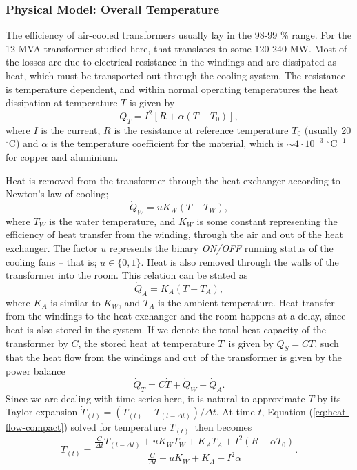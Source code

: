 \documentclass[]{article}
\begin{document}
\subsubsection{Physical Model: Overall Temperature} \label{sec:physical-model-overall}
The efficiency of air-cooled transformers usually lay in the 98-99 \% range. For the 12 MVA transformer studied here, that translates to some 120-240 MW. Most of the losses are due to electrical resistance in the windings and are dissipated as heat, which must be transported out through the cooling system. The resistance is temperature dependent, and within normal operating temperatures the heat dissipation at temperature $T$ is given by
\begin{equation}
\dot{Q}_T = I^2 [R + \alpha(T - T_0)],
\end{equation}
where $I$ is the current, $R$ is the resistance at reference temperature $T_0$ (usually 20 $^\circ$C) and $\alpha$ is the temperature coefficient for the material, which is $\sim 4 \cdot 10^{-3}$ $^\circ \text{C}^{-1}$ for copper and aluminium. 

Heat is removed from the transformer through the heat exchanger according to Newton's law of cooling;
\begin{equation}
	\dot{Q}_W = uK_W (T - T_W),
\end{equation}
where $T_W$ is the water temperature, and $K_W$ is some constant representing the efficiency of heat transfer from the winding, through the air and out of the heat exchanger. The factor $u$ represents the binary \textit{ON/OFF} running status of the cooling fans -- that is; $u \in \{0,1\}$. Heat is also removed through the walls of the transformer into the room. This relation can be stated as
\begin{equation}
	\dot{Q}_A = K_A (T - T_A),
\end{equation}
where $K_A$ is similar to $K_W$, and $T_A$ is the ambient temperature. Heat transfer from the windings to the heat exchanger and the room happens at a delay, since heat is also stored in the system. If we denote the total heat capacity of the transformer by $C$, the stored heat at temperature $T$ is given by $Q_S = CT$, such that the heat flow from the windings and out of the transformer is given by the power balance
\begin{equation} \label{eq:heat-flow-compact}
	\dot{Q}_T = C \dot{T} + \dot{Q}_W + \dot{Q}_A.
\end{equation}
Since we are dealing with time series here, it is natural to approximate $\dot{T}$ by its Taylor expansion $\dot{T}_{(t)} = (T_{(t)} - T_{(t-\Delta t)})/ \Delta t$. At time $t$, Equation (\ref{eq:heat-flow-compact}) solved for temperature $T_{(t)}$ then becomes
\begin{equation} \label{eq:physical-overall}
	T_{(t)} = \frac{\frac{C}{\Delta t} T_{(t-\Delta t)} + uK_W T_W + K_A T_A + I^2 (R - \alpha T_0)}{\frac{C}{\Delta t} + uK_W + K_A - I^2 \alpha}.
\end{equation}
\end{document}
